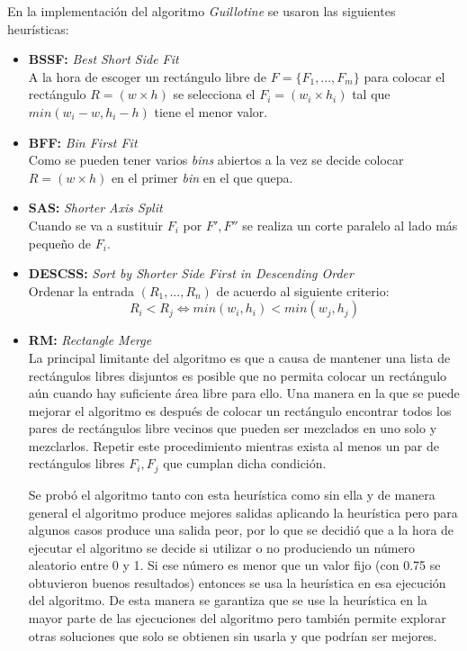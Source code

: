 \documentclass[a4paper,10pt,twocolumn]{article}
\begin{document}
En la implementación del algoritmo \textit{Guillotine} se usaron las siguientes heurísticas:
\begin{itemize}
	\item \textbf{BSSF:} \textit{Best Short Side Fit}\\
	A la hora de escoger un rectángulo libre de $F = \{F_1,...,F_m\}$ para colocar el rectángulo $R = (w \times h)$ se selecciona el $F_i = (w_i \times h_i)$ tal que $min(w_i-w,h_i-h)$ tiene el menor valor. 
	\item \textbf{BFF:} \textit{Bin First Fit}\\
	Como se pueden tener varios \textit{bins} abiertos a la vez se decide colocar $R = (w \times h)$ en el primer \textit{bin} en el que quepa.
	\item \textbf{SAS:} \textit{Shorter Axis Split}\\
	Cuando se va a sustituir $F_i$ por $F',F''$ se realiza un corte paralelo al lado más pequeño de $F_i$.
	\item \textbf{DESCSS:} \textit{Sort by Shorter Side First in Descending Order}\\
	Ordenar la entrada $(R_1,...,R_n)$ de acuerdo al siguiente criterio:
	$$R_i < R_j \Longleftrightarrow min(w_i,h_i) < min (w_j,h_j)$$ 
	\item \textbf{RM:} \textit{Rectangle Merge}\\
	La principal limitante del algoritmo es que a causa de mantener una lista de rectángulos libres disjuntos es posible que no permita colocar un rectángulo aún cuando hay suficiente área libre para ello. Una manera en la que se puede mejorar el algoritmo es después de colocar un rectángulo encontrar todos los pares de rectángulos libre vecinos que pueden ser mezclados en uno solo y mezclarlos. Repetir este procedimiento mientras exista al menos un par de rectángulos libres $F_i, F_j$ que cumplan dicha condición.
	
	Se probó el algoritmo tanto con esta heurística como sin ella y de manera general el algoritmo produce mejores salidas aplicando la heurística pero para algunos casos produce una salida peor, por lo que se decidió que a la hora de ejecutar el algoritmo se decide si utilizar o no produciendo un número aleatorio entre 0 y 1. Si ese número es menor que un valor fijo (con 0.75 se obtuvieron buenos resultados) entonces se usa la heurística en esa ejecución del algoritmo. De esta manera se garantiza que se use la heurística en la mayor parte de las ejecuciones del algoritmo pero también permite explorar otras soluciones que solo se obtienen sin usarla y que podrían ser mejores. 
\end{itemize}
\end{document}
